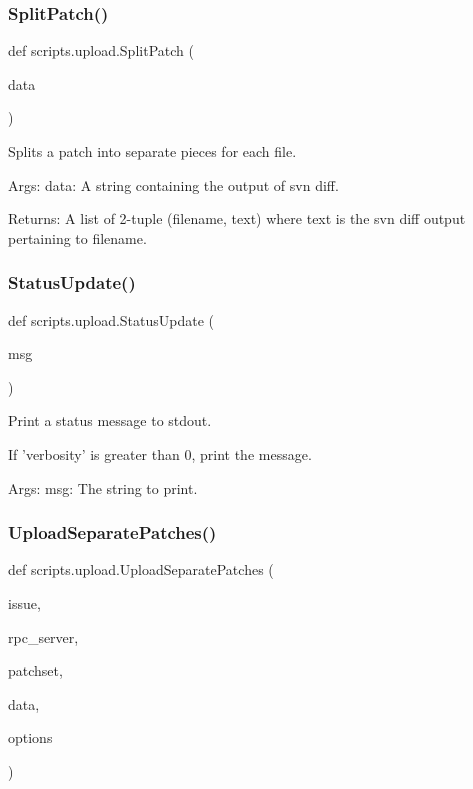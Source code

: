 \subsubsection{\texorpdfstring{SplitPatch()}{SplitPatch()}}
{\footnotesize\ttfamily def scripts.\+upload.\+Split\+Patch (\begin{DoxyParamCaption}\item[{}]{data }\end{DoxyParamCaption})}

\begin{DoxyVerb}Splits a patch into separate pieces for each file.

Args:
  data: A string containing the output of svn diff.

Returns:
  A list of 2-tuple (filename, text) where text is the svn diff output
    pertaining to filename.
\end{DoxyVerb}
 \mbox{\label{namespacescripts_1_1upload_a0adebb4560d4a0e086056bef8b616f23}} 
\subsubsection{\texorpdfstring{StatusUpdate()}{StatusUpdate()}}
{\footnotesize\ttfamily def scripts.\+upload.\+Status\+Update (\begin{DoxyParamCaption}\item[{}]{msg }\end{DoxyParamCaption})}

\begin{DoxyVerb}Print a status message to stdout.

If 'verbosity' is greater than 0, print the message.

Args:
  msg: The string to print.
\end{DoxyVerb}
 \mbox{\label{namespacescripts_1_1upload_a58d6db5116f3d6ffe2c457b2781f4502}} 
\subsubsection{\texorpdfstring{UploadSeparatePatches()}{UploadSeparatePatches()}}
{\footnotesize\ttfamily def scripts.\+upload.\+Upload\+Separate\+Patches (\begin{DoxyParamCaption}\item[{}]{issue,  }\item[{}]{rpc\+\_\+server,  }\item[{}]{patchset,  }\item[{}]{data,  }\item[{}]{options }\end{DoxyParamCaption})}

